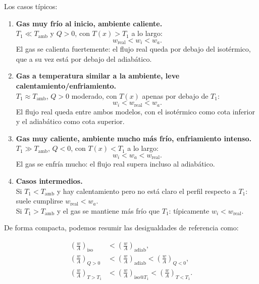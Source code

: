 \documentclass[11pt,a4paper]{article}
\begin{document}
Los casos típicos:

\begin{enumerate}
  \item \textbf{Gas muy frío al inicio, ambiente caliente.}\\
        \(T_1 \ll T_\text{amb}\) y \(Q>0\), con \(T(x)>T_1\) a lo largo:
        \[
        w_\text{real} < w_i < w_a.
        \]
        El gas se calienta fuertemente: el flujo real queda por debajo del
        isotérmico, que a su vez está por debajo del adiabático.

  \item \textbf{Gas a temperatura similar a la ambiente, leve calentamiento/enfriamiento.}\\
        \(T_1 \approx T_\text{amb}\), \(Q>0\) moderado, con \(T(x)\) apenas por debajo de \(T_1\):
        \[
        w_i < w_\text{real} < w_a.
        \]
        El flujo real queda entre ambos modelos, con el isotérmico como cota
        inferior y el adiabático como cota superior.

  \item \textbf{Gas muy caliente, ambiente mucho más frío, enfriamiento intenso.}\\
        \(T_1 \gg T_\text{amb}\), \(Q<0\), con \(T(x)<T_1\) a lo largo:
        \[
        w_i < w_a < w_\text{real}.
        \]
        El gas se enfría mucho: el flujo real supera incluso al adiabático.

  \item \textbf{Casos intermedios.}\\
        Si \(T_1<T_\text{amb}\) y hay calentamiento pero no está claro el
        perfil respecto a \(T_1\): suele cumplirse \(w_\text{real} < w_a\).\\
        Si \(T_1>T_\text{amb}\) y el gas se mantiene más frío que \(T_1\):
        típicamente \(w_i < w_\text{real}\).
\end{enumerate}

De forma compacta, podemos resumir las desigualdades de referencia como:

\begin{align}
\left(\frac{w}{A}\right)_{\text{iso}}
&<
\left(\frac{w}{A}\right)_{\text{adiab}},
\\[4pt]
\left(\frac{w}{A}\right)_{Q>0}
&<
\left(\frac{w}{A}\right)_{\text{adiab}}
<
\left(\frac{w}{A}\right)_{Q<0},
\\[4pt]
\left(\frac{w}{A}\right)_{T>T_1}
&<
\left(\frac{w}{A}\right)_{\text{iso@}T_1}
<
\left(\frac{w}{A}\right)_{T<T_1}.
\end{align}
\end{document}
